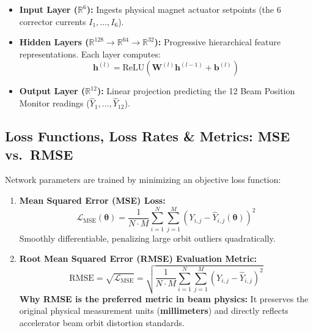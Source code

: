 \documentclass[11pt,a4paper]{article}
\begin{document}
\begin{itemize}
    \item \textbf{Input Layer ($\mathbb{R}^6$):} Ingests physical magnet actuator setpoints (the 6 corrector currents $I_1, \dots, I_6$).
    \item \textbf{Hidden Layers ($\mathbb{R}^{128} \rightarrow \mathbb{R}^{64} \rightarrow \mathbb{R}^{32}$):} Progressive hierarchical feature representations. Each layer computes:
    \begin{equation}
        \mathbf{h}^{(l)} = \text{ReLU}\left( \mathbf{W}^{(l)} \mathbf{h}^{(l-1)} + \mathbf{b}^{(l)} \right)
    \end{equation}
    \item \textbf{Output Layer ($\mathbb{R}^{12}$):} Linear projection predicting the 12 Beam Position Monitor readings ($\hat{Y}_1, \dots, \hat{Y}_{12}$).
\end{itemize}

\subsection{Loss Functions, Loss Rates \& Metrics: MSE vs.\ RMSE}
Network parameters are trained by minimizing an objective loss function:
\begin{enumerate}
    \item \textbf{Mean Squared Error (MSE) Loss:}
    \begin{equation}
        \mathcal{L}_{\text{MSE}}(\boldsymbol{\theta}) = \frac{1}{N \cdot M} \sum_{i=1}^N \sum_{j=1}^M \left( Y_{i,j} - \hat{Y}_{i,j}(\boldsymbol{\theta}) \right)^2
    \end{equation}
    Smoothly differentiable, penalizing large orbit outliers quadratically.
    
    \item \textbf{Root Mean Squared Error (RMSE) Evaluation Metric:}
    \begin{equation}
        \text{RMSE} = \sqrt{\mathcal{L}_{\text{MSE}}} = \sqrt{\frac{1}{N \cdot M} \sum_{i=1}^N \sum_{j=1}^M \left( Y_{i,j} - \hat{Y}_{i,j} \right)^2}
    \end{equation}
    \textbf{Why RMSE is the preferred metric in beam physics:} It preserves the original physical measurement units (\textbf{millimeters}) and directly reflects accelerator beam orbit distortion standards.
\end{enumerate}
\end{document}
